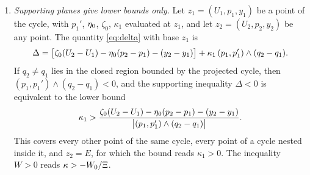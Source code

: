 \begin{proposition}
\begin{enumerate}[label=(\roman*)]
\begin{equation}\label{gau:certificate}
\Dt\Lambda+\eta-\mu=\varepsilon_\Lambda-p\,\kappa,\qquad \avg{\Dt\Lambda+\eta-\mu}=\lambda_c .
\end{equation}
Hence $\Dt\Lambda+\eta-\mu\le0$ on the cycle if and only if
\begin{gather*}
\kappa\ge\frac{\varepsilon_\Lambda}{p}\ \text{ on the rising arc},\qquad
\kappa\le\frac{\varepsilon_\Lambda}{p}\ \text{ on the falling arc},\\
\varepsilon_\Lambda\le0\ \text{ at the crest and at the trough}.
\end{gather*}
\item \emph{Supporting planes give lower bounds only.} Let $z_1=(U_1,p_1,y_1)$ be a point of the cycle, with $p_1'$, $\eta_0$, $\zeta_0$, $\kappa_1$ evaluated at $z_1$, and let $z_2=(U_2,p_2,y_2)$ be any point. The quantity \eqref{eq:delta} with base $z_1$ is
\begin{equation}\label{gau:deltakappa}
\Delta=\bigl[\zeta_0(U_2-U_1)-\eta_0(p_2-p_1)-(y_2-y_1)\bigr]+\kappa_1\,(p_1,p_1')\wedge(q_2-q_1).
\end{equation}
If $q_2\ne q_1$ lies in the closed region bounded by the projected cycle, then $(p_1,p_1')\wedge(q_2-q_1)<0$, and the supporting inequality $\Delta<0$ is equivalent to the lower bound
\[
\kappa_1>\frac{\zeta_0(U_2-U_1)-\eta_0(p_2-p_1)-(y_2-y_1)}{\bigl|(p_1,p_1')\wedge(q_2-q_1)\bigr|}.
\]
This covers every other point of the same cycle, every point of a cycle nested inside it, and $z_2=E$, for which the bound reads $\kappa_1>0$. The inequality $W>0$ reads $\kappa>-W_0/\Xi$.
\end{enumerate}
\end{proposition}
